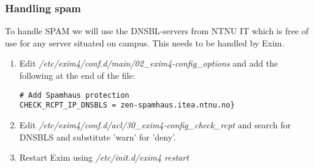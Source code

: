 \subsubsection{Handling spam}
To handle SPAM we will use the DNSBL-servers from NTNU IT which is free of use
for any server situated on campus. This needs to be handled by Exim.

\begin{enumerate}
  \item Edit \emph{/etc/exim4/conf.d/main/02\_exim4-config\_options} and add the following at the end of the file:
\begin{lstlisting}
# Add Spamhaus protection
CHECK_RCPT_IP_DNSBLS = zen-spamhaus.itea.ntnu.no}
\end{lstlisting}

\item Edit \emph{/etc/exim4/conf.d/acl/30\_exim4-config\_check\_rcpt} and search for DNSBLS and substitute 'warn' for 'deny'.

\item Restart Exim using \emph{/etc/init.d/exim4 restart}
\end{enumerate}

